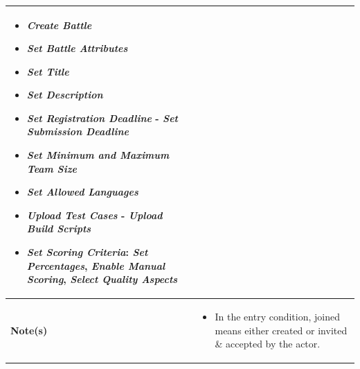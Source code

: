 \begin{enumerate}
\begin{center}
\begin{tabular}{ | m{5em} | m{13cm}| }
    
      \begin{itemize}
          \item \textit{Create Battle}
          \item \textit{Set Battle Attributes}
          \item \textit{Set Title}
          \item \textit{Set Description}
          \item \textit{Set Registration Deadline} - \textit{Set Submission Deadline}
          \item \textit{Set Minimum and Maximum Team Size}
          \item \textit{Set Allowed Languages}
          \item \textit{Upload Test Cases} - \textit{Upload Build Scripts}
          \item \textit{Set Scoring Criteria}: \textit{Set Percentages}, \textit{Enable Manual Scoring}, \textit{Select Quality Aspects}
      \end{itemize}
          \\ 
      \hline
      \textbf{Note(s)} & 
      \begin{itemize}
          \item In the entry condition, joined means either created or invited \& accepted by the actor.
      \end{itemize}
          \\ 
      \hline
    \end{tabular}
\end{center} 


\newpage


\end{enumerate}
